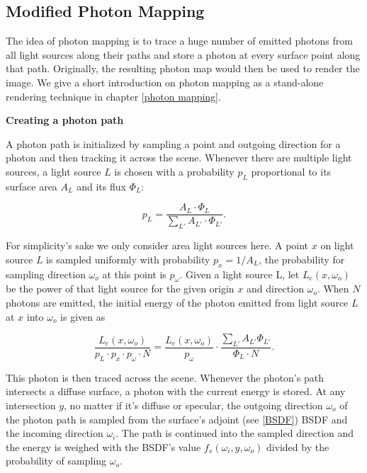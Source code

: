 \subsection{Modified Photon Mapping}
\label{modified photon mapping}
The idea of photon mapping is to trace a huge number of emitted photons from all light sources along their paths and store a photon at every surface point along that path. Originally, the resulting photon map would then be used to render the image. We give a short introduction on photon mapping as a stand-alone rendering technique in chapter \ref{photon mapping}.

\newpage
\textbf{Creating a photon path}

A photon path is initialized by sampling a point and outgoing direction for a photon and then tracking it across the scene. Whenever there are multiple light sources, a light source $L$ is chosen with a probability $p_L$ proportional to its surface area $A_L$ and its flux $\Phi_L$: 

\begin{equation}
p_L = \frac{A_L \cdot \Phi_L}{\sum_{L'}A_{L'} \cdot \Phi_{L'}}.
\end{equation}

For simplicity's sake we only consider area light sources here. A point $x$ on light source $L$ is sampled uniformly with probability $p_x = 1/A_L$, the probability for sampling direction $\omega_o$ at this point is $p_\omega$. Given a light source L, let $L_e(x,\omega_o)$ be the power of that light source for the given origin $x$ and direction $\omega_o$. When $N$ photons are emitted, the initial energy of the photon emitted from light source $L$ at $x$ into $\omega_o$ is given as

\begin{equation}
\label{initialenergy}
\frac{L_e(x,\omega_o)}{p_L \cdot p_x \cdot p_\omega \cdot N} =  \frac{L_e(x,\omega_o)}{p_\omega} \cdot \frac{\sum_{L'} A_{L'} \Phi_{L'}}{\Phi_L \cdot N}.
\end{equation}


This photon is then traced across the scene. Whenever the photon's path intersects a diffuse surface, a photon with the current energy is stored. At any intersection $y$, no matter if it's diffuse or specular, the outgoing direction $\omega_o$ of the photon path is sampled from the surface's adjoint (see \ref{BSDF}) BSDF and the incoming direction $\omega_i$. The path is continued into the sampled direction and the energy is weighed with the BSDF's value $f_s(\omega_i,y,\omega_o)$ divided by the probability of sampling $\omega_o$.\\

